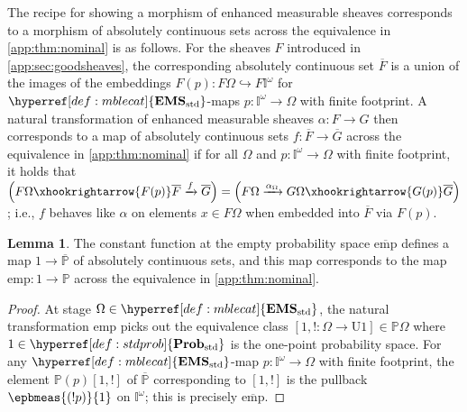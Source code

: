 \documentclass[
  sigconf,
  screen, ]{acmart}
\theoremstyle{definition}
\newtheorem{lemma}[theorem]{Lemma}
\newcommand\nref[2]{\hyperref[#1]{#2}} \newcommand\checkhigh{{\huge{\color{red}\textbf{TODO: check}}}}
\newcommand\texforgetmu{\mathrm{U}}
\newcommand\forgetmu{{\nref{def:forgetmu}{\texforgetmu}}}
\newcommand\texhcube{{{{\mathbb I}^\omega}}}
\newcommand\hcube{{\nref{def:hcube}{\texhcube}}}
\newcommand\texagoodname{absolutely continuous set}
\newcommand\agoodname{\texagoodname}
\newcommand\sheafcatadj{enhanced measurable}
\newcommand\texgoodsheaves{\sheafcatadj{} sheaves}
\newcommand\goodsheaves{\texgoodsheaves}
\newcommand\texStdProb{\mathbf{Prob}_{\rm std}}
\newcommand\StdProb{{\nref{def:stdprob}{\texStdProb}}}
\newcommand\texStdMble{\mathbf{EMS}_{\rm std}}
\newcommand\StdMble{{\nref{def:mblecat}{\texStdMble}}}
\newcommand\pcmunit{{\nref{app:def:pspcs-join-unit}{\mathrm{emp}}}}
\newcommand\texpspcs{\mathbb P}
\newcommand\pspcs{{\nref{def:mble-pspcs}{\texpspcs}}}
\newcommand\gpcmunit{{\nref{app:def:emp-gpspcs}{\overline{\mathrm{emp}}}}}
\newcommand\texgpspcs{\overline{\mathbb P}}
\newcommand\gpspcs{{\nref{def:gpspcs}{\texgpspcs}}}
\begin{document}
The recipe 
for showing a morphism of \goodsheaves{}
corresponds to a morphism of \agoodname{s}
across the equivalence in \cref{app:thm:nominal}
is as follows. For the sheaves
 $F$ introduced in \cref{app:sec:goodsheaves}, the corresponding \agoodname{} $\overline F$
is a union of the images of the
embeddings $F(p) : F\Omega\hookrightarrow F\hcube$
for $\StdMble$-maps $p : \hcube\to\Omega$ with finite footprint.
A natural transformation of \goodsheaves{} $\alpha : F\to G$
then corresponds to a map of \agoodname{s} $f : \overline F\to \overline G$
across the equivalence in \cref{app:thm:nominal} if
for all $\Omega$ and $p : \hcube\to\Omega$ with finite footprint,
it holds that $\left(F\Omega\xhookrightarrow{F(p)}
\overline F\xrightarrow f\overline G\right) 
= \left(F\Omega\xrightarrow{\alpha_\Omega}G\Omega
\xhookrightarrow{G(p)}\overline G\right)$;
i.e., $f$ behaves like $\alpha$ on elements
$x\in F\Omega$ when embedded into $\overline F$ via $F(p)$.

\begin{lemma} \label{app:lem:pcmunit-corresp}
  The constant function at the empty probability space
  $\gpcmunit$ defines a map $1\to\gpspcs$
  of \agoodname{s},
  and this map corresponds to
  the map $\pcmunit : 1\to \pspcs$
  across the equivalence in \cref{app:thm:nominal}.
\end{lemma}
\begin{proof}
  At stage $\Omega\in\StdMble$,
  the natural transformation $\pcmunit$
  picks out the equivalence class $[1,!:\Omega\to \forgetmu 1]\in\pspcs\Omega$
  where $1\in\StdProb$ is the
  one-point probability space.
  For any $\StdMble$-map $p : \hcube\to\Omega$ with finite footprint,
  the element $\pspcs(p)[1,!]$
  of $\gpspcs$ corresponding to $[1,!]$
  is the pullback $\epbmeas{(!p)}{1}$
  on $\hcube$; this is precisely $\gpcmunit$.
\end{proof}
\end{document}

